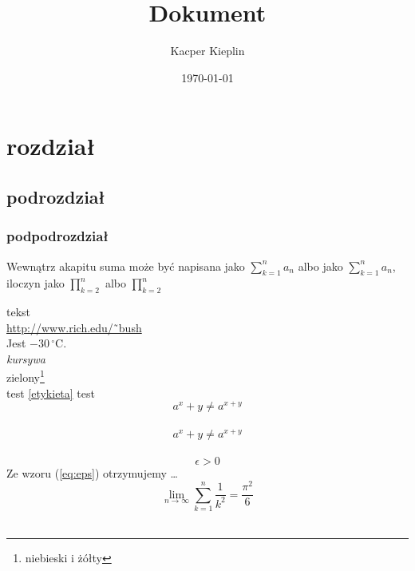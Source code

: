 \documentclass[a4paper,11pt]{article}
\title{Dokument}
\author{Kacper Kieplin}
\date{ \today}
\begin{document}
\maketitle
\begin{center}
\tableofcontents
\end{center}

\section{rozdział}
\subsection{podrozdział}
\subsubsection{podpodrozdział} 

Wewnątrz akapitu suma może być napisana jako $\sum^n_{k=1}a_n$ albo jako $\displaystyle\sum^n_{k=1}a_n$, iloczyn jako $\prod^n _{k=2}$ albo $\displaystyle\prod^n _{k=2}$

tekst\\
\url{http://www.rich.edu/˜bush}\\
Jest $-30\,^{\circ}\mathrm{C}$.\\
\emph{kursywa}\\
zielony\footnote{niebieski i żółty}\\

\label{etykieta}
test
\ref{etykieta}
test
\pageref{etykieta}\\

\begin{displaymath}
a^x+y \neq a^{x+y}
\end{displaymath}\\

\begin{equation}
a^x+y \neq a^{x+y}
\end{equation}\\

\begin{equation}
\epsilon > 0 \label{eq:eps}
\end{equation}
Ze wzoru (\ref{eq:eps})
otrzymujemy \ldots\\

\begin{displaymath}
\lim_{n \to \infty}
\sum_{k=1}^n \frac{1}{k^2}
= \frac{\pi^2}{6}
\end{displaymath}\\
\end{document}
